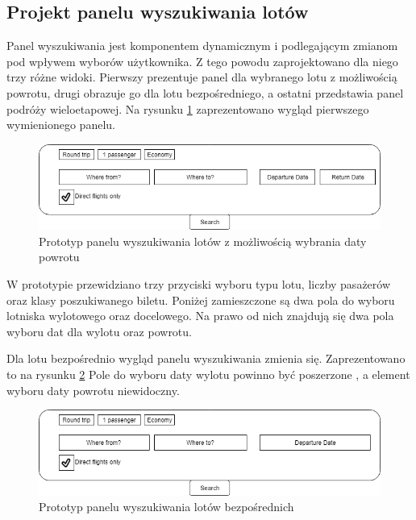 \documentclass[12pt, twoside]{report}
\begin{document}
\subsection{Projekt panelu wyszukiwania lotów}
Panel wyszukiwania jest komponentem dynamicznym i podlegającym zmianom pod wpływem wyborów użytkownika. Z tego powodu zaprojektowano dla niego trzy różne widoki. Pierwszy prezentuje panel dla wybranego lotu z możliwością powrotu, drugi obrazuje go dla lotu bezpośredniego, a ostatni przedstawia panel podróży wieloetapowej. Na rysunku \ref{fig:interface_project_departure} zaprezentowano wygląd pierwszego wymienionego panelu.
\begin{figure}[!ht]
\centering
\includegraphics[scale=0.60, keepaspectratio]{interface_project_departure.PNG}
\caption{Prototyp panelu wyszukiwania lotów z możliwością wybrania daty powrotu}
\label{fig:interface_project_departure}
\end{figure}

\noindent W prototypie przewidziano trzy przyciski wyboru typu lotu, liczby pasażerów oraz klasy poszukiwanego biletu. Poniżej zamieszczone są dwa pola do wyboru lotniska wylotowego oraz docelowego. Na prawo od nich znajdują się dwa pola wyboru dat dla wylotu oraz powrotu. 

Dla lotu bezpośrednio wygląd panelu wyszukiwania zmienia się. Zaprezentowano to na rysunku \ref{fig:interface_project_direct} Pole do wyboru daty wylotu powinno być poszerzone , a element wyboru daty powrotu niewidoczny.
\begin{figure}[!ht]
\centering
\includegraphics[scale=0.60, keepaspectratio]{interface_project_direct.PNG}
\caption{Prototyp panelu wyszukiwania lotów bezpośrednich}
\label{fig:interface_project_direct}
\end{figure}
\end{document}
